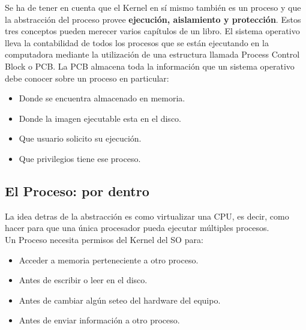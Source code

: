 \documentclass[../main.tex]{subfiles}
\begin{document}
        Se ha de tener en cuenta que el Kernel en sí mismo también es un proceso y que la abstracción del proceso provee \textbf{ejecución, aislamiento y protección}. Estos tres conceptos pueden merecer varios capítulos de un libro. El sistema operativo lleva la contabilidad de todos los procesos que se están ejecutando en la computadora mediante la utilización de una estructura llamada Process Control Block o PCB. La PCB almacena toda la información que un sistema operativo debe conocer sobre un proceso en particular:

        \begin{itemize}
            \item Donde se encuentra almacenado en memoria.
            \item Donde la imagen ejecutable esta en el disco.
            \item Que usuario solicito su ejecución.
            \item Que privilegios tiene ese proceso.
        \end{itemize}

\subsection{El Proceso: por dentro}
    La idea detras de la abstracción es como virtualizar una CPU, es decir, como hacer para que una única procesador pueda ejecutar múltiples procesos.\\

    Un Proceso necesita permisos del Kernel del SO para:
    \begin{itemize}
        \item Acceder a memoria perteneciente a otro proceso.
        \item Antes de escribir o leer en el disco.
        \item Antes de cambiar algún seteo del hardware del equipo.
        \item Antes de enviar información a otro proceso.
    \end{itemize}
\end{document}
